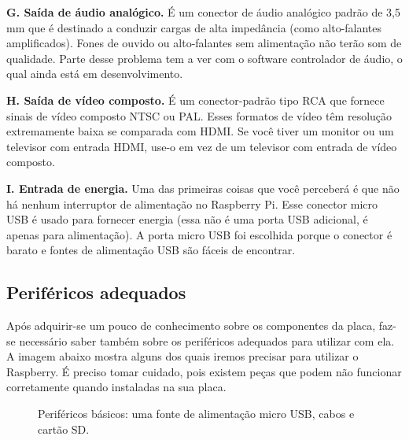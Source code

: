 \textbf{G. Saída de áudio analógico.} É um conector de áudio analógico padrão de 3,5 mm que é destinado a conduzir cargas de alta impedância (como alto-falantes amplificados). Fones de ouvido ou alto-falantes sem alimentação não terão som de qualidade. Parte desse problema tem a ver com o software controlador de áudio, o qual ainda está em desenvolvimento.

\textbf{H. Saída de vídeo composto.} É um conector-padrão tipo RCA que fornece sinais de vídeo composto NTSC ou PAL. Esses formatos de vídeo têm resolução extremamente baixa se comparada com HDMI. Se você tiver um monitor ou um televisor com entrada HDMI, use-o em vez de um televisor com entrada de vídeo composto.

\textbf{I. Entrada de energia.} Uma das primeiras coisas que você perceberá é que não há nenhum interruptor de alimentação no Raspberry Pi. Esse conector micro USB é usado para fornecer energia (essa não é uma porta USB adicional, é apenas para alimentação). A porta micro USB foi escolhida porque o conector é barato e fontes de alimentação USB são fáceis de encontrar.

\subsection{Periféricos adequados}

Após adquirir-se um pouco de conhecimento sobre os componentes da placa, faz-se necessário saber também sobre os periféricos adequados para utilizar com ela. A imagem abaixo mostra alguns dos quais iremos precisar para utilizar o Raspberry. É preciso tomar cuidado, pois existem peças que podem não funcionar corretamente quando instaladas na sua placa.

\begin{figure}[ht]
    \centering
    \caption{Periféricos básicos: uma fonte de alimentação micro USB, cabos e cartão SD.}
\end{figure}

